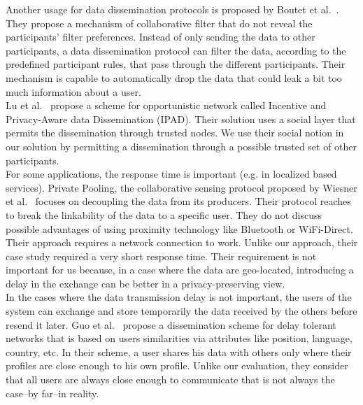 Another usage for data dissemination protocols is proposed by Boutet et al.~\cite{DBLP:journals/computing/BoutetFGJK16}.
They propose a mechanism of collaborative filter that do not reveal the participants' filter preferences.
Instead of only sending the data to other participants, a data dissemination protocol can filter the data, according to the predefined participant rules, that pass through the different participants.
Their mechanism is capable to automatically drop the data that could leak a bit too much information about a user.
\\

Lu et al.~\cite{DBLP:conf/infocom/LuLSCS13} propose a scheme for opportunistic network called Incentive and Privacy-Aware data Dissemination (IPAD).
Their solution uses a social layer that permits the dissemination through trusted nodes.
We use their social notion in our solution by permitting a dissemination through a possible trusted set of other participants.
\\

For some applications, the response time is important (e.g. in localized based services).
Private Pooling, the collaborative sensing protocol proposed by Wiesner et al.~\cite{DBLP:conf/mobisec/WiesnerDD11} focuses on decoupling the data from its producers.
Their protocol reaches to break the linkability of the data to a specific user.
They do not discuss possible advantages of using proximity technology like Bluetooth or WiFi-Direct.
Their approach requires a network connection to work.
Unlike our approach, their case study required a very short response time.
Their requirement is not important for us because, in a case where the data are geo-located, introducing a delay in the exchange can be better in a privacy-preserving view.
\\

In the cases where the data transmission delay is not important, the users of the system can exchange and store temporarily the data received by the others before resend it later.
Guo et al.~\cite{DBLP:conf/infocom/GuoZYF13} propose a dissemination scheme for delay tolerant networks that is based on users similarities via attributes like position, language, country, etc.
In their scheme, a user shares his data with others only where their profiles are close enough to his own profile.
Unlike our evaluation, they consider that all users are always close enough to communicate that is not always the case--by far--in reality.
\\


